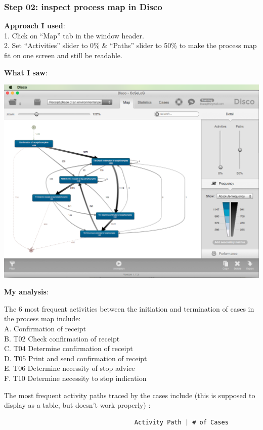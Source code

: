 \documentclass[]{article}
\begin{document}
\subsubsection{Step 02: inspect process map in
Disco}\label{step-02-inspect-process-map-in-disco}

\textbf{Approach I used}:\\1. Click on ``Map'' tab in the window
header.\\2. Set ``Activities'' slider to 0\% \& ``Paths'' slider to 50\%
to make the process map fit on one screen and still be readable.

\textbf{What I saw}:

\includegraphics{CoSeLoG_Step_02.png}

\textbf{My analysis}:

The 6 most frequent activities between the initiation and termination of
cases in the process map include:\\A. Confirmation of receipt\\B. T02
Check confirmation of receipt\\C. T04 Determine confirmation of
receipt\\D. T05 Print and send confirmation of receipt\\E. T06 Determine
necessity of stop advice\\F. T10 Determine necessity to stop indication

The most frequent activity paths traced by the cases include (this is
supposed to display as a table, but doesn't work properly) :

\begin{verbatim}
                                    Activity Path | # of Cases  
\end{verbatim}
\end{document}
